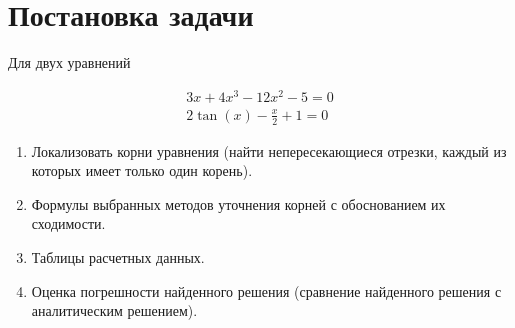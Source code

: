 \documentclass[../main.tex]{subfiles}
\begin{document}
\section{Постановка задачи}

Для двух уравнений

\begin{align*}
    & 3x + 4x^3 - 12 x^2 - 5 = 0 &\\
    & 2 \tan (x) - \frac{x}{2} + 1 = 0 &
\end{align*}


\begin{enumerate}
    \item Локализовать корни уравнения (найти непересекающиеся отрезки, каждый из которых имеет только один корень).
    \item Формулы выбранных методов уточнения корней с обоснованием их сходимости.
    \item Таблицы расчетных данных.
    \item Оценка погрешности найденного решения (сравнение найденного решения с аналитическим решением).
\end{enumerate}
\end{document}
